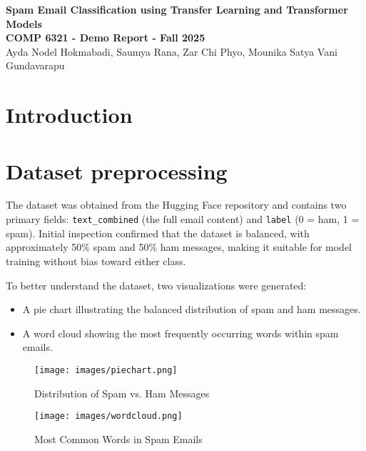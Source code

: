 \documentclass[12pt]{article}
\begin{document}
\begin{center}
{\Large \textbf{Spam Email Classification using Transfer Learning and Transformer Models}}\\[8pt]
{\small \textbf{COMP 6321 - Demo Report - Fall 2025}}\\[5pt]
{\small Ayda Nodel Hokmabadi, Saumya Rana, Zar Chi Phyo, Mounika Satya Vani Gundavarapu}\\[3pt]
\end{center}

\section{Introduction}


\section{Dataset preprocessing}
The dataset was obtained from the Hugging Face repository and contains two primary fields: \texttt{text\_combined} (the full email content) and \texttt{label} (0 = ham, 1 = spam).  
Initial inspection confirmed that the dataset is balanced, with approximately 50\% spam and 50\% ham messages, making it suitable for model training without bias toward either class.


To better understand the dataset, two visualizations were generated:
\begin{itemize}
    \item A pie chart illustrating the balanced distribution of spam and ham messages.
    \item A word cloud showing the most frequently occurring words within spam emails.
\end{itemize}

\begin{figure}[h!]
    \centering
    \begin{minipage}[t]{0.45\textwidth}
        \centering
        \texttt{[image: images/piechart.png]}
        \caption{Distribution of Spam vs. Ham Messages}
        \label{fig:piechart}
    \end{minipage}\hfill
    \begin{minipage}[t]{0.45\textwidth}
        \centering
        \texttt{[image: images/wordcloud.png]}
        \caption{Most Common Words in Spam Emails}
        \label{fig:wordcloud}
    \end{minipage}
\end{figure}
\end{document}
